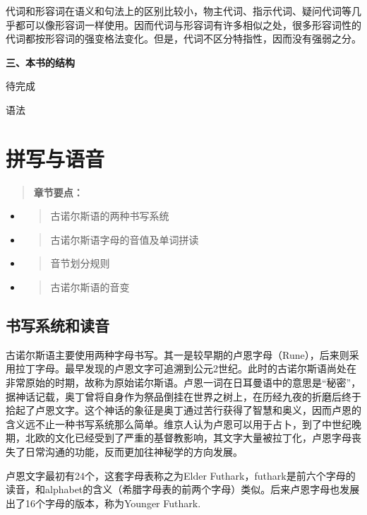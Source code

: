 代词和形容词在语义和句法上的区别比较小，物主代词、指示代词、疑问代词等几乎都可以像形容词一样使用。因而代词与形容词有许多相似之处，很多形容词性的代词都按形容词的强变格法变化。但是，代词不区分特指性，因而没有强弱之分。

\textbf{三、本书的结构}

待完成

语法

\section{拼写与语音}\label{ux62fcux5199ux4e0eux8bedux97f3}

\begin{quote}
\textbf{章节要点：}
\end{quote}

\begin{itemize}
\item
  \begin{quote}
  古诺尔斯语的两种书写系统
  \end{quote}
\item
  \begin{quote}
  古诺尔斯语字母的音值及单词拼读
  \end{quote}
\item
  \begin{quote}
  音节划分规则
  \end{quote}
\item
  \begin{quote}
  古诺尔斯语的音变
  \end{quote}
\end{itemize}

\subsection{书写系统和读音}\label{ux4e66ux5199ux7cfbux7edfux548cux8bfbux97f3}

古诺尔斯语主要使用两种字母书写。其一是较早期的卢恩字母（Rune），后来则采用拉丁字母。最早发现的卢恩文字可追溯到公元2世纪。此时的古诺尔斯语尚处在非常原始的时期，故称为原始诺尔斯语。卢恩一词在日耳曼语中的意思是``秘密''，据神话记载，奥丁曾将自身作为祭品倒挂在世界之树上，在历经九夜的折磨后终于拾起了卢恩文字。这个神话的象征是奥丁通过苦行获得了智慧和奥义，因而卢恩的含义远不止一种书写系统那么简单。维京人认为卢恩可以用于占卜，到了中世纪晚期，北欧的文化已经受到了严重的基督教影响，其文字大量被拉丁化，卢恩字母丧失了日常沟通的功能，反而更加往神秘学的方向发展。

卢恩文字最初有24个，这套字母表称之为Elder
Futhark，futhark是前六个字母的读音，和alphabet的含义（希腊字母表的前两个字母）类似。后来卢恩字母也发展出了16个字母的版本，称为Younger
Futhark.

